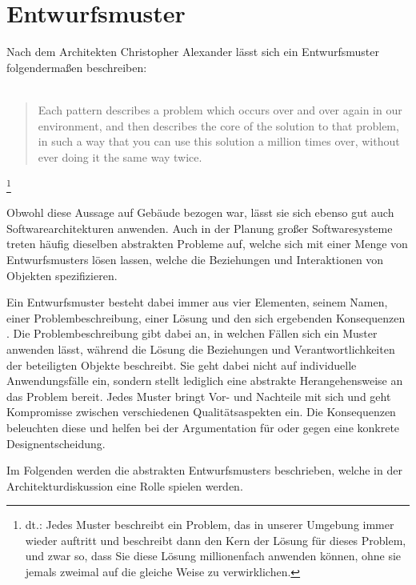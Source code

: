 \section{Entwurfsmuster}

Nach dem Architekten Christopher Alexander lässt sich ein Entwurfsmuster folgendermaßen beschreiben:\\
\\

\blockquote{Each pattern describes a problem which occurs over and over again in our environment, and then describes the core of the solution to that problem, in such a way that you can use this solution a million times over, without ever doing it the same way twice.}\footnote{dt.: Jedes Muster beschreibt ein Problem, das in unserer Umgebung immer wieder auftritt und beschreibt dann den Kern der Lösung für dieses Problem, und zwar so, dass Sie diese Lösung millionenfach anwenden können, ohne sie jemals zweimal auf die gleiche Weise zu verwirklichen.} \cite{gamma_design_1995}\\
\\

Obwohl diese Aussage auf Gebäude bezogen war, lässt sie sich ebenso gut auch Softwarearchitekturen anwenden. Auch in der Planung großer Softwaresysteme treten häufig dieselben abstrakten Probleme auf, welche sich mit einer Menge von Entwurfsmusters lösen lassen, welche die Beziehungen und Interaktionen von Objekten spezifizieren.

Ein Entwurfsmuster besteht dabei immer aus vier Elementen, seinem Namen, einer Problembeschreibung, einer Lösung und den sich ergebenden Konsequenzen \cite{gamma_design_1995}. Die Problembeschreibung gibt dabei an, in welchen Fällen sich ein Muster anwenden lässt, während die Lösung die Beziehungen und Verantwortlichkeiten der beteiligten Objekte beschreibt. Sie geht dabei nicht auf individuelle Anwendungsfälle ein, sondern stellt lediglich eine abstrakte Herangehensweise an das Problem bereit. Jedes Muster bringt Vor- und Nachteile mit sich und geht Kompromisse zwischen verschiedenen Qualitätsaspekten ein. Die Konsequenzen beleuchten diese und helfen bei der Argumentation für oder gegen eine konkrete Designentscheidung.

Im Folgenden werden die abstrakten Entwurfsmusters beschrieben, welche in der Architekturdiskussion eine Rolle spielen werden.






